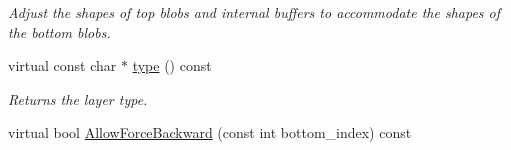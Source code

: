\begin{DoxyCompactItemize}
\begin{DoxyCompactList}\small\item\em Adjust the shapes of top blobs and internal buffers to accommodate the shapes of the bottom blobs. \end{DoxyCompactList}\item 
\mbox{\label{classcaffe_1_1_euclidean_loss_layer_afe52ebbfc18c5cc36e0bdc35445c82e5}} 
virtual const char $\ast$ \mbox{\hyperlink{classcaffe_1_1_euclidean_loss_layer_afe52ebbfc18c5cc36e0bdc35445c82e5}{type}} () const
\begin{DoxyCompactList}\small\item\em Returns the layer type. \end{DoxyCompactList}\item 
virtual bool \mbox{\hyperlink{classcaffe_1_1_euclidean_loss_layer_a76dd3fde9f09cb9840f05ee035b5a2c5}{Allow\+Force\+Backward}} (const int bottom\+\_\+index) const
\end{DoxyCompactItemize}
